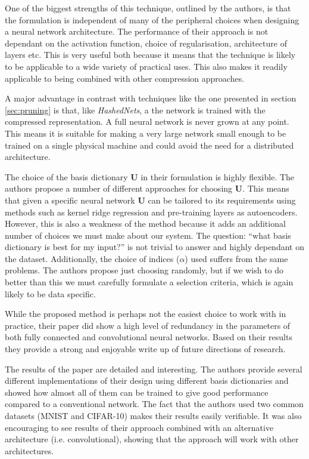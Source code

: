 \documentclass[journal]{IEEEtran}
\begin{document}
One of the biggest strengths of this technique, outlined by the authors, is that the formulation is independent of many of the peripheral choices when designing a neural network architecture. The performance of their approach is not dependant on the activation function, choice of regularisation, architecture of layers etc. This is very useful both because it means that the technique is likely to be applicable to a wide variety of practical uses. This also makes it readily applicable to being combined with other compression approaches.

A major advantage in contrast with techniques like the one presented in section \ref{sec:pruning} is that, like \textit{HashedNets}, a the network is trained with the compressed representation. A full neural network is never grown at any point. This means it is suitable for making a very large network small enough to be trained on a single physical machine and could avoid the need for a distributed architecture.

The choice of the basis dictionary $\bm{U}$ in their formulation is highly flexible. The authors propose a number of different approaches for choosing $\bm{U}$. This means that given a specific neural network $\bm{U}$ can be tailored to its requirements using methods such as kernel ridge regression and pre-training layers as autoencoders. However, this is also a weakness of the method because it adds an additional number of choices we must make about our system. The question: ``what basis dictionary is best for my input?'' is not trivial to answer and highly dependant on the dataset. Additionally, the choice of indices ($\alpha$) used suffers from the same problems. The authors propose just choosing randomly, but if we wish to do better than this we must carefully formulate a selection criteria, which is again likely to be data specific.

While the proposed method is perhaps not the easiest choice to work with in practice, their paper did show a high level of redundancy in the parameters of both fully connected and convolutional neural networks. Based on their results they provide a strong and enjoyable write up of future directions of research.

The results of the paper are detailed and interesting. The authors provide several different implementations of their design using different basis dictionaries and showed how almost all of them can be trained to give good performance compared to a conventional network. The fact that the authors used two common datasets (MNIST and CIFAR-10) makes their results easily verifiable. It was also encouraging to see results of their approach combined with an alternative architecture (i.e. convolutional), showing that the approach will work with other architectures.
\end{document}
